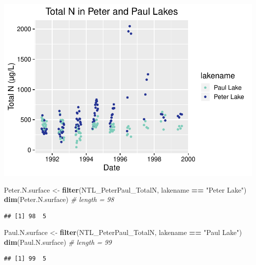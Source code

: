 \documentclass[]{article}
\newenvironment{Shaded}{\begin{snugshade}}{\end{snugshade}}
\newcommand{\KeywordTok}[1]{\textcolor[rgb]{0.13,0.29,0.53}{\textbf{#1}}}
\newcommand{\StringTok}[1]{\textcolor[rgb]{0.31,0.60,0.02}{#1}}
\newcommand{\CommentTok}[1]{\textcolor[rgb]{0.56,0.35,0.01}{\textit{#1}}}
\newcommand{\OperatorTok}[1]{\textcolor[rgb]{0.81,0.36,0.00}{\textbf{#1}}}
\newcommand{\NormalTok}[1]{#1}
\begin{document}
\includegraphics{A08_TimeSeries_files/figure-latex/unnamed-chunk-5-1.pdf}

\begin{Shaded}
\begin{Highlighting}[]
\NormalTok{Peter.N.surface <-}\StringTok{ }\KeywordTok{filter}\NormalTok{(NTL_PeterPaul_TotalN, lakename }\OperatorTok{==}\StringTok{ "Peter Lake"}\NormalTok{)}
\KeywordTok{dim}\NormalTok{(Peter.N.surface) }\CommentTok{# length = 98}
\end{Highlighting}
\end{Shaded}

\begin{verbatim}
## [1] 98  5
\end{verbatim}

\begin{Shaded}
\begin{Highlighting}[]
\NormalTok{Paul.N.surface <-}\StringTok{ }\KeywordTok{filter}\NormalTok{(NTL_PeterPaul_TotalN, lakename }\OperatorTok{==}\StringTok{ "Paul Lake"}\NormalTok{)}
\KeywordTok{dim}\NormalTok{(Paul.N.surface) }\CommentTok{# length = 99}
\end{Highlighting}
\end{Shaded}

\begin{verbatim}
## [1] 99  5
\end{verbatim}

\begin{Shaded}
\end{Shaded}
\end{document}

